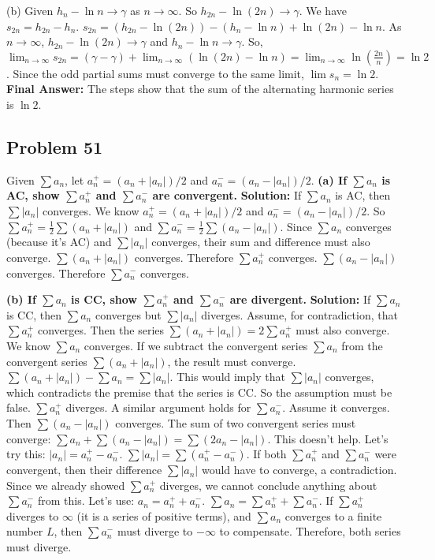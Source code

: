 \documentclass{article}
\begin{document}
(b) Given $h_n - \ln n \to \gamma$ as $n \to \infty$. So $h_{2n} - \ln(2n) \to \gamma$.
We have $s_{2n} = h_{2n} - h_n$.
$s_{2n} = (h_{2n} - \ln(2n)) - (h_n - \ln n) + \ln(2n) - \ln n$.
As $n \to \infty$, $h_{2n}-\ln(2n) \to \gamma$ and $h_n - \ln n \to \gamma$.
So, $\lim_{n \to \infty} s_{2n} = (\gamma - \gamma) + \lim_{n \to \infty} (\ln(2n)-\ln n) = \lim_{n \to \infty} \ln(\frac{2n}{n}) = \ln 2$.
Since the odd partial sums must converge to the same limit, $\lim s_n = \ln 2$.
\textbf{Final Answer:} The steps show that the sum of the alternating harmonic series is $\ln 2$.

\subsection*{Problem 51}
Given $\sum a_n$, let $a_n^+ = (a_n+|a_n|)/2$ and $a_n^- = (a_n-|a_n|)/2$.
\textbf{(a) If $\sum a_n$ is AC, show $\sum a_n^+$ and $\sum a_n^-$ are convergent.}
\textbf{Solution:} If $\sum a_n$ is AC, then $\sum |a_n|$ converges.
We know $a_n^+ = (a_n+|a_n|)/2$ and $a_n^- = (a_n-|a_n|)/2$.
So $\sum a_n^+ = \frac{1}{2} \sum (a_n + |a_n|)$ and $\sum a_n^- = \frac{1}{2} \sum (a_n - |a_n|)$.
Since $\sum a_n$ converges (because it's AC) and $\sum |a_n|$ converges, their sum and difference must also converge.
$\sum(a_n + |a_n|)$ converges. Therefore $\sum a_n^+$ converges.
$\sum(a_n - |a_n|)$ converges. Therefore $\sum a_n^-$ converges.

\textbf{(b) If $\sum a_n$ is CC, show $\sum a_n^+$ and $\sum a_n^-$ are divergent.}
\textbf{Solution:} If $\sum a_n$ is CC, then $\sum a_n$ converges but $\sum |a_n|$ diverges.
Assume, for contradiction, that $\sum a_n^+$ converges.
Then the series $\sum (a_n + |a_n|) = 2 \sum a_n^+$ must also converge.
We know $\sum a_n$ converges. If we subtract the convergent series $\sum a_n$ from the convergent series $\sum(a_n+|a_n|)$, the result must converge.
$\sum(a_n+|a_n|) - \sum a_n = \sum |a_n|$.
This would imply that $\sum |a_n|$ converges, which contradicts the premise that the series is CC. So the assumption must be false. $\sum a_n^+$ diverges.
A similar argument holds for $\sum a_n^-$. Assume it converges.
Then $\sum(a_n-|a_n|)$ converges.
The sum of two convergent series must converge: $\sum a_n + \sum(a_n-|a_n|) = \sum(2a_n - |a_n|)$. This doesn't help.
Let's try this: $|a_n| = a_n^+ - a_n^-$. $\sum |a_n| = \sum (a_n^+ - a_n^-)$.
If both $\sum a_n^+$ and $\sum a_n^-$ were convergent, then their difference $\sum |a_n|$ would have to converge, a contradiction.
Since we already showed $\sum a_n^+$ diverges, we cannot conclude anything about $\sum a_n^-$ from this.
Let's use: $a_n = a_n^+ + a_n^-$. $\sum a_n = \sum a_n^+ + \sum a_n^-$.
If $\sum a_n^+$ diverges to $\infty$ (it is a series of positive terms), and $\sum a_n$ converges to a finite number $L$, then $\sum a_n^-$ must diverge to $-\infty$ to compensate.
Therefore, both series must diverge.
\end{document}

